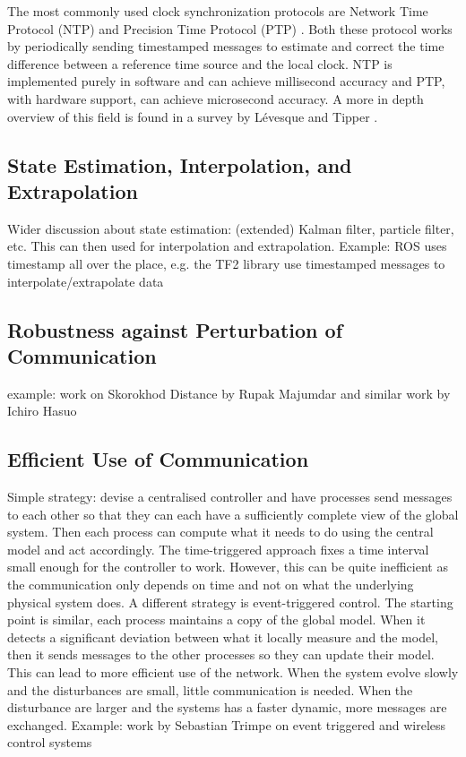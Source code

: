 \documentclass[
graybox,
envcountchap
]{svmult}
\begin{document}
\begin{bibunit}
    The most commonly used clock synchronization protocols are Network Time Protocol (NTP) \cite{rfc5905} and Precision Time Protocol (PTP) \cite{4579760}.
    Both these protocol works by periodically sending timestamped messages to estimate and correct the time difference between a reference time source and the local clock.
    NTP is implemented purely in software and can achieve millisecond accuracy and PTP, with hardware support, can achieve microsecond accuracy.
    A more in depth overview of this field is found in a survey by L\'evesque and Tipper \cite{DBLP:journals/comsur/LevesqueT16}.
  
    \subsection{State Estimation, Interpolation, and Extrapolation}
    
    Wider discussion about state estimation: (extended) Kalman filter, particle filter, etc.
    This can then used for interpolation and extrapolation.
    Example: ROS uses timestamp all over the place, e.g. the TF2 library use timestamped messages to interpolate/extrapolate data    
   
    \subsection{Robustness against Perturbation of Communication}

    example: work on Skorokhod Distance by Rupak Majumdar \cite{DBLP:conf/cav/DeshmukhMP15,DBLP:conf/hybrid/MajumdarP15} and similar work by Ichiro Hasuo \cite{DBLP:conf/cyphy/KidoSH17,DBLP:conf/adhs/KidoSH18}



    \subsection{Efficient Use of Communication}

    Simple strategy: devise a centralised controller and have processes send messages to each other so that they can each have a sufficiently complete view of the global system.
    Then each process can compute what it needs to do using the central model and act accordingly.
    The time-triggered approach fixes a time interval small enough for the controller to work.
    However, this can be quite inefficient as the communication only depends on time and not on what the underlying physical system does.
    A different strategy is event-triggered control.
    The starting point is similar, each process maintains a copy of the global model.
    When it detects a significant deviation between what it locally measure and the model, then it sends messages to the other processes so they can update their model.
    This can lead to more efficient use of the network.
    When the system evolve slowly and the disturbances are small, little communication is needed.
    When the disturbance are larger and the systems has a faster dynamic, more messages are exchanged.
    Example: work by Sebastian Trimpe on event triggered and wireless control systems



\end{bibunit}
\end{document}
